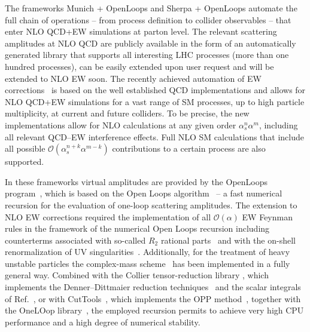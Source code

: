\documentclass[11pt]{cernrep}
\begin{document}
The frameworks {\sc Munich + OpenLoops} and {\sc Sherpa + OpenLoops}
automate the full chain of operations -- from process definition to
collider observables -- that enter NLO QCD+EW simulations at parton
level.
%
The relevant scattering amplitudes at NLO QCD are publicly available
in the form of an automatically generated library
\cite{openloops-hepforge} that supports all interesting LHC processes
(more than one hundred processes), can be easily extended upon user
request and will be extended to NLO EW soon.
%
The recently achieved automation of EW
corrections~\cite{Kallweit:2014xda,Kallweit:2015dum} is based on the
well established QCD implementations and allows for NLO QCD+EW
simulations for a vast range of SM processes, up to high particle
multiplicity, at current and future colliders.
%
To be precise, the new implementations allow for NLO calculations at
any given order $\alpha_s^n\alpha^m$, including all relevant QCD--EW
interference effects.  Full NLO SM calculations that include all
possible $\mathcal{O}(\alpha_s^{n+k} \alpha^{m-k})$ contributions to a
certain process are also supported.


In these frameworks virtual amplitudes are provided by the {\sc OpenLoops}
program~\cite{openloops-hepforge}, which is based on the Open Loops algorithm~\cite{Cascioli:2011va} --
a fast numerical recursion for the evaluation of one-loop scattering 
amplitudes.
%
The extension to NLO EW corrections required the
implementation of all $\mathcal{O}(\alpha)$ EW Feynman rules in the
framework of the numerical Open Loops recursion including counterterms
associated with so-called $R_2$ rational parts~\cite{Garzelli:2009is}
and with the on-shell renormalization of UV
singularities~\cite{Denner:1991kt}.  Additionally, for the treatment
of heavy unstable particles the complex-mass
scheme~\cite{Denner:2005fg} has been implemented in a fully general
way.
%
Combined with the {\sc Collier} tensor-reduction library
\cite{Denner:2014gla}, which implements the Denner--Dittmaier
reduction techniques~\cite{Denner:2002ii,Denner:2005nn} and the scalar
integrals of Ref.~\cite{Denner:2010tr}, or with {\sc
  CutTools}~\cite{Ossola:2007ax}, which implements the OPP
method~\cite{Ossola:2006us}, together with the {\sc OneLOop}
library~\cite{vanHameren:2010cp}, the employed recursion permits to
achieve very high CPU performance and a high degree of numerical
stability.
\end{document}
